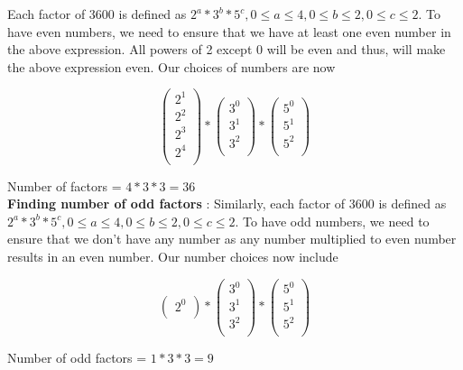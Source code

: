 Each factor of 3600 is defined as $2^a * 3^b * 5^c, 0 \leq a \leq 4, 0 \leq b \leq 2, 0 \leq c \leq 2$. To have even numbers, we need to ensure that we have at least one even number in the above expression. All powers of 2 except 0 will be even and thus, will make the above expression even. Our choices of numbers are now 

$$
\begin{pmatrix}
    2^1 \\
    2^2 \\
    2^3 \\
    2^4 \\
\end{pmatrix}
*
\begin{pmatrix}
    3^0 \\
    3^1 \\
    3^2 \\
\end{pmatrix}
*
\begin{pmatrix}
    5^0 \\
    5^1 \\
    5^2 \\
\end{pmatrix}
$$

Number of factors = $4 * 3 * 3 = 36$ \\

\textbf{Finding number of odd factors} : Similarly, each factor of 3600 is defined as $2^a * 3^b * 5^c, 0 \leq a \leq 4, 0 \leq b \leq 2, 0 \leq c \leq 2$. To have odd numbers, we need to ensure that we don't have any number as any number multiplied to even number results in an even number. Our number choices now include 

$$
\begin{pmatrix}
    2^0 \\
\end{pmatrix}
*
\begin{pmatrix}
    3^0 \\
    3^1 \\
    3^2 \\
\end{pmatrix}
*
\begin{pmatrix}
    5^0 \\
    5^1 \\
    5^2 \\
\end{pmatrix}
$$

Number of odd factors = $1 * 3 * 3 = 9$ \\


